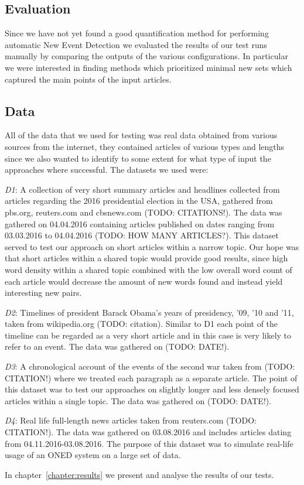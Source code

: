 \subsection{Evaluation}
Since we have not yet found a good quantification method for performing automatic New Event Detection we evaluated the results of our test runs manually by comparing the outputs of the various configurations. In particular we were interested in finding methods which prioritized minimal new sets which captured the main points of the input articles. 

\subsection{Data}
All of the data that we used for testing was real data obtained from various sources from the internet, they contained articles of various types and lengths since we also wanted to identify to some extent for what type of input the approaches where successful. The datasets we used were:

\emph{D1}: A collection of very short summary articles and headlines collected from articles regarding the 2016 presidential election in the USA, gathered from pbs.org, reuters.com and cbsnews.com (TODO: CITATIONS!). The data was gathered on 04.04.2016 containing articles published on dates ranging from 03.03.2016 to 04.04.2016 (TODO: HOW MANY ARTICLES?). This dataset served to test our approach on short articles within a narrow topic. Our hope was that short articles within a shared topic would provide good results, since high word density within a shared topic combined with the low overall word count of each article would decrease the amount of new words found and instead yield interesting new pairs.

\emph{D2}: Timelines of president Barack Obama's years of presidency, '09, '10 and '11, taken from wikipedia.org (TODO: citation). Similar to D1 each point of the timeline can be regarded as a very short article and in this case is very likely to refer to an event. The data was gathered on (TODO: DATE!).

\emph{D3}: A chronological account of the events of the second war taken from (TODO: CITATION!) where we treated each paragraph as a separate article. The point of this dataset was to test our approaches on slightly longer and less densely focused articles within a single topic. The data was gathered on (TODO: DATE!).

\emph{D4}: Real life full-length news articles taken from reuters.com (TODO: CITATION!). The data was gathered on 03.08.2016 and includes articles dating from 04.11.2016-03.08.2016. The purpose of this dataset was to simulate real-life usage of an ONED system on a large set of data.

In chapter~\ref{chapter:results} we present and analyse the results of our tests.
